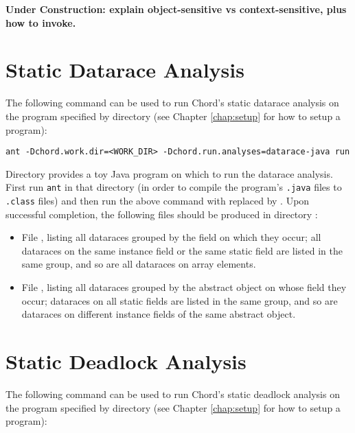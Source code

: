 {\bf Under Construction: explain object-sensitive vs context-sensitive, plus how
to invoke.}

\section{Static Datarace Analysis}

The following command can be used to run Chord's static datarace analysis on the
program specified by directory  (see Chapter \ref{chap:setup}
for how to setup a program):

\begin{framed}
\begin{verbatim}
ant -Dchord.work.dir=<WORK_DIR> -Dchord.run.analyses=datarace-java run
\end{verbatim}
\end{framed}

Directory  provides a toy Java program on which to
run the datarace analysis.  First run {\tt ant} in that directory (in order to
compile the program's {\tt .java} files to {\tt .class} files) and then run the
above command with  replaced by .
Upon successful completion, the following files should be produced in directory
:

\begin{itemize}
\item
File , listing all dataraces grouped by the field on
which they occur; all dataraces on the same instance field or the same static
field are listed in the same group, and so are all dataraces on array elements.
\item
File , listing all dataraces grouped by the abstract
object on whose field they occur; dataraces on all static fields are listed in
the same group, and so are dataraces on different instance fields of the same
abstract object.
\end{itemize}

\section{Static Deadlock Analysis}

The following command can be used to run Chord's static deadlock analysis on the
program specified by directory  (see Chapter \ref{chap:setup}
for how to setup a program):


